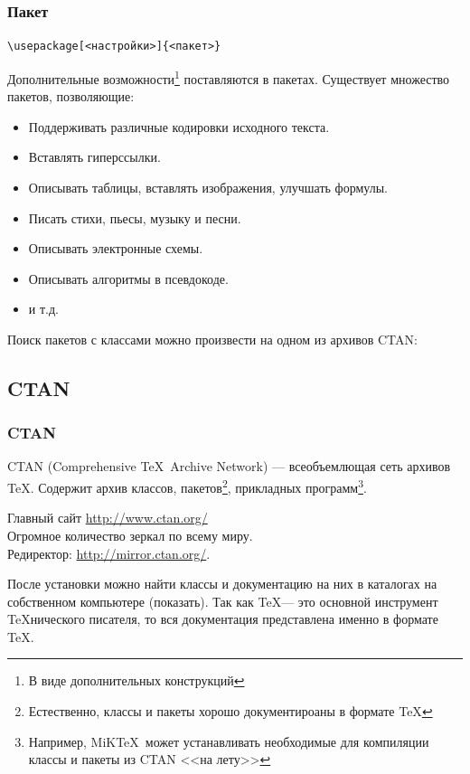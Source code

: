 \begin{frame}[fragile]
\frametitle{Пакет}

\begin{center}
\verb"\usepackage[<настройки>]{<пакет>}"
\end{center}

Дополнительные \alert{возможности}\footnote{В виде дополнительных конструкций} поставляются в \alert{пакетах}. Существует множество пакетов, позволяющие:
\begin{itemize}
    \item Поддерживать различные кодировки исходного текста.
    \item Вставлять гиперссылки.
    \item Описывать таблицы, вставлять изображения, улучшать формулы.
    \item Писать стихи, пьесы, музыку и песни.
    \item Описывать электронные схемы.
    \item Описывать алгоритмы в псевдокоде.
    \item и т.д.
\end{itemize}
\end{frame}

Поиск пакетов с классами можно произвести на одном из архивов CTAN:


\subsection{CTAN}


\begin{frame}
\frametitle{CTAN}
\begin{definition}
    \alert{CTAN} (Comprehensive \TeX\ Archive Network) --- всеобъемлющая сеть архивов \TeX. Содержит архив классов, пакетов\footnote{Естественно, классы и пакеты хорошо документироаны в формате \TeX}, прикладных программ\footnote{Например, MiK\TeX\ может устанавливать необходимые для компиляции классы и пакеты из CTAN <<на лету>>}.
\end{definition}

Главный сайт \url{http://www.ctan.org/}\\
Огромное количество зеркал по всему миру.\\
Редиректор: \url{http://mirror.ctan.org/}.
\end{frame}

После установки можно найти классы и документацию на них в каталогах на собственном компьютере (показать). Так как \TeX --- это основной инструмент \TeX нического писателя, то вся документация представлена именно в формате \TeX.


